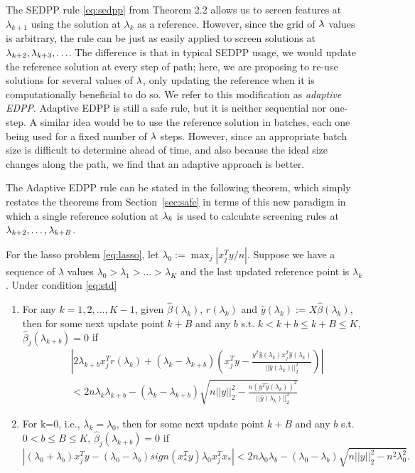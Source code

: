 The SEDPP rule \eqref{eq:sedpp} from Theorem 2.2 allows us to screen features at $\lambda_{k+1}$ using the solution at $\lambda_k$ as a reference. However, since the grid of $\lambda$ values is arbitrary, the rule can be just as easily applied to screen solutions at $\lambda_{k+2}, \lambda_{k+3}, \ldots$.  The difference is that in typical SEDPP usage, we would update the reference solution at every step of path; here, we are proposing to re-use solutions for several values of $\lambda$, only updating the reference when it is computationally beneficial to do so.  We refer to this modification as \emph{adaptive EDPP}.  Adaptive EDPP is still a safe rule, but it is neither sequential nor one-step.  A similar idea would be to use the reference solution in batches, each one being used for a fixed number of $\lambda$ steps.  However, since an appropriate batch size is difficult to determine ahead of time, and also because the ideal size changes along the path, we find that an adaptive approach is better. 

The Adaptive EDPP rule can be stated in the following theorem, which simply restates the theorems from Section~\ref{sec:safe} in terms of this new paradigm in which a single reference solution at $\lambda_k$ is used to calculate screening rules at $\lambda_{k+2}, \ldots, \lambda_{k+B}$.

\begin{theorem}
    For the lasso problem \eqref{eq:lasso}, let $\lambda_0:=\max_j|x_j^Ty/n|$. Suppose we have a sequence of $\lambda$ values $\lambda_0>\lambda_1>...>\lambda_K$ and the last updated reference point is $\lambda_k$. Under condition \eqref{eq:std}
    \begin{enumerate}
        \item For any $k=1,2,...,K-1$, given $\hat{\beta}(\lambda_k)$, $r(\lambda_k)$ and $\hat{y}(\lambda_k):=X\hat{\beta}(\lambda_k)$, then for some next update point $k+B$ and any $b$ s.t. $k<k+b\leq k+B\leq K$, $\hat{\beta}_j(\lambda_{k+b})=0$ if
        \begin{equation}
            \label{eq:aedpp1}
            \begin{split}
                &\left|2\lambda_{k+b}x_j^Tr(\lambda_k)+(\lambda_k-\lambda_{k+b})\left( x_j^Ty-\frac{y^T\hat{y}(\lambda_k)x_j^T\hat{y}(\lambda_k)}{||\hat{y}(\lambda_k)||_2^2}\right)\right|\\&<2n\lambda_k\lambda_{k+b}-(\lambda_k-\lambda_{k+b})\sqrt{n||y||_2^2-\frac{n(y^T\hat{y}(\lambda_k))^2}{||\hat{y}(\lambda_k)||_2^2}}
            \end{split}
        \end{equation}
        \item For k=0, i.e., $\lambda_k=\lambda_0$, then for some next update point $k+B$ and any $b$ s.t. $0<b\leq B\leq K$, $\hat{\beta}_j(\lambda_{k+b})=0$ if
        \begin{equation}
            \label{eq:aedpp2}
            |(\lambda_0+\lambda_b)x_j^Ty-(\lambda_0-\lambda_b)sign(x_*^Ty)\lambda_0x_j^Tx_*|<2n\lambda_0\lambda_b-(\lambda_0-\lambda_b)\sqrt{n||y||_2^2-n^2\lambda_0^2}.
        \end{equation}
    \end{enumerate}
\end{theorem}

